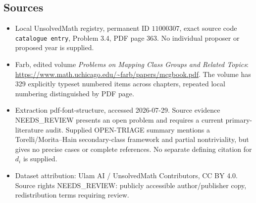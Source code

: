 \documentclass[11pt]{article}
\begin{document}
\subsection{Sources}
\begin{itemize}
\item Local UnsolvedMath registry, permanent ID \(11000307\), exact source code \texttt{catalogue entry}, Problem 3.4, PDF page 363. No individual proposer or proposed year is supplied.
\item Farb, edited volume \emph{Problems on Mapping Class Groups and Related Topics}: \url{https://www.math.uchicago.edu/~farb/papers/mcgbook.pdf}. The volume has 329 explicitly typeset numbered items across chapters, repeated local numbering distinguished by PDF page.
\item Extraction pdf-font-structure, accessed 2026-07-29. Source evidence NEEDS\_REVIEW presents an open problem and requires a current primary-literature audit. Supplied OPEN-TRIAGE summary mentions a Torelli/Morita--Hain secondary-class framework and partial nontriviality, but gives no precise cases or complete references. No separate defining citation for \(d_i\) is supplied.
\item Dataset attribution: Ulam AI / UnsolvedMath Contributors, CC BY 4.0. Source rights NEEDS\_REVIEW: publicly accessible author/publisher copy, redistribution terms requiring review.
\end{itemize}
\end{document}
